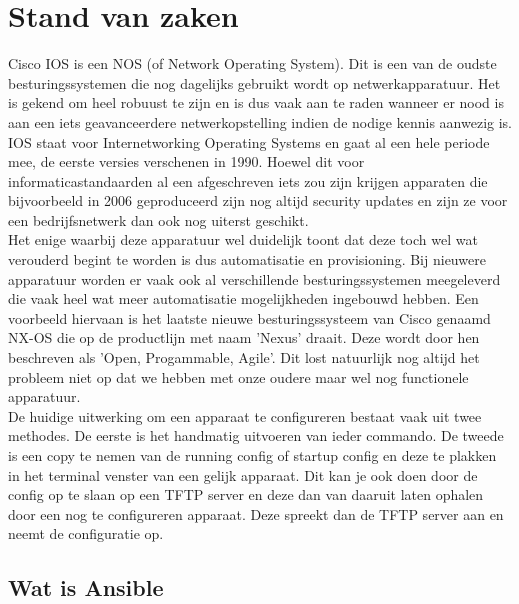 \section{Stand van zaken}
\label{sec:stand-van-zaken}
Cisco IOS is een NOS (of Network Operating System). Dit is een van de oudste besturingssystemen die nog dagelijks gebruikt wordt op netwerkapparatuur. Het is gekend om heel robuust te zijn en is dus vaak aan te raden wanneer er nood is aan een iets geavanceerdere netwerkopstelling indien de nodige kennis aanwezig is. IOS staat voor Internetworking Operating Systems en gaat al een hele periode mee, de eerste versies verschenen in 1990. Hoewel dit voor informaticastandaarden al een afgeschreven iets zou zijn krijgen apparaten die bijvoorbeeld in 2006 geproduceerd zijn nog altijd security updates en zijn ze voor een bedrijfsnetwerk dan ook nog uiterst geschikt. \autocite{historyOfCiscoCli} 
\\

Het enige waarbij deze apparatuur wel duidelijk toont dat deze toch wel wat verouderd begint te worden is dus automatisatie en  provisioning. Bij nieuwere apparatuur worden er vaak ook al verschillende besturingssystemen meegeleverd die vaak heel wat meer automatisatie mogelijkheden ingebouwd hebben. Een voorbeeld hiervaan is het laatste nieuwe besturingssysteem van Cisco genaamd NX-OS die op de productlijn met naam 'Nexus' draait. Deze wordt door hen beschreven als 'Open, Progammable,  Agile'. Dit lost natuurlijk nog altijd het probleem niet op dat we hebben met onze oudere maar wel nog functionele apparatuur. \autocite{ciscoNxos}
\\

De huidige uitwerking om een apparaat te configureren bestaat vaak uit twee methodes. De eerste is het handmatig uitvoeren van ieder commando. De tweede is een copy te nemen van de running config of startup config en deze te plakken in het terminal venster van een gelijk apparaat. Dit kan je ook doen door de config op te slaan op een TFTP server en deze dan van daaruit laten ophalen door een nog te configureren apparaat. Deze spreekt dan de TFTP server aan en neemt de configuratie op.

\subsection{Wat is Ansible}
\label{sec:whatisansible}

